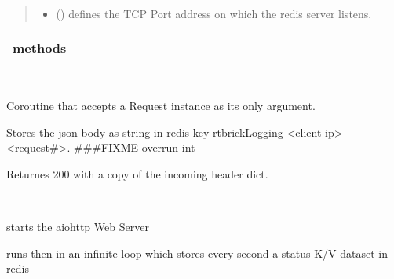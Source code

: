 \documentclass[letterpaper,10pt,english]{sphinxmanual}
\begin{document}
\begin{fulllineitems}
\begin{quote}
\begin{description}
\begin{itemize}
\item {} 
\sphinxstyleliteralstrong{\sphinxupquote{{[}}}\sphinxstyleliteralstrong{\sphinxupquote{{]}}} () \textendash{} defines the TCP Port address on which the redis server listens.

\end{itemize}

\end{description}\end{quote}


\begin{savenotes}\sphinxattablestart
\centering
\begin{tabulary}{\linewidth}[t]{|T|T|}
\hline

methods
&\\
\hline
\end{tabulary}
\par
\sphinxattableend\end{savenotes}

\begin{fulllineitems}
\label{\detokenize{modules:restServer.restHttpServer.handler}}~
\begin{DUlineblock}{0em}
\item[] Coroutine that accepts a Request instance as its only argument.
\item[] Stores the json body as string in redis key rtbrickLogging-\textless{}client-ip\textgreater{}-\textless{}request\#\textgreater{}. \#\#\#FIXME overrun int
\item[] Returnes 200 with a copy of the incoming header dict.
\end{DUlineblock}

\end{fulllineitems}


\begin{fulllineitems}
\label{\detokenize{modules:restServer.restHttpServer.run_forever}}~
\begin{DUlineblock}{0em}
\item[] starts the aiohttp Web Server
\item[] runs then in an infinite loop which stores every second a status K/V dataset in redis
\end{DUlineblock}

\end{fulllineitems}


\end{fulllineitems}
\end{document}
